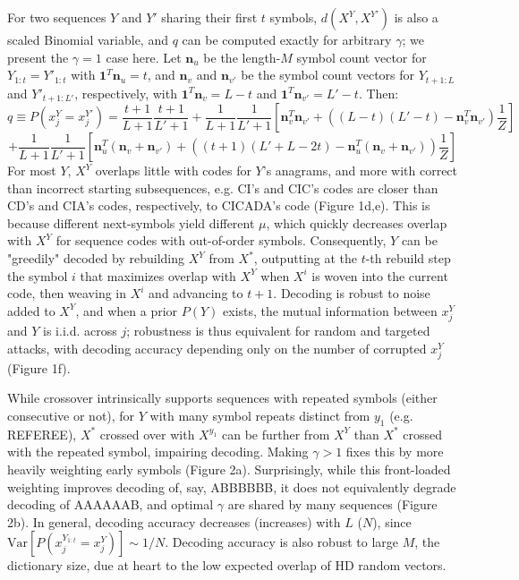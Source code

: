 \documentclass{article}
\begin{document}
For two sequences $Y$ and $Y'$ sharing their first $t$ symbols, $d(X^Y, X^{Y'})$ is also a scaled Binomial variable, and $q$ can be computed exactly for arbitrary $\gamma$; we present the $\gamma = 1$ case here. Let $\mathbf{n}_u$ be the length-$M$ symbol count vector for $Y_{1:t} = Y'_{1:t}$ with $\mathbf{1}^T\mathbf{n}_u = t$, and $\mathbf{n}_v$ and $\mathbf{n}_{v'}$ be the symbol count vectors for $Y_{t+1:L}$ and $Y'_{t+1:L'}$, respectively, with $\mathbf{1}^T\mathbf{n}_{v} = L - t$ and $\mathbf{1}^T\mathbf{n}_{v'} = L' - t$. Then:
$$q \equiv P(x_j^Y = x_j^{Y'}) = \frac{t+1}{L+1}\frac{t+1}{L'+1} + \frac{1}{L+1}\frac{1}{L'+1}\left[\mathbf{n}^T_v\mathbf{n}_{v'} + \left((L-t)(L'-t) - \mathbf{n}^T_v\mathbf{n}_{v'} \right)\frac{1}{Z}\right]$$
$$+\frac{1}{L+1}\frac{1}{L'+1}\left[
\mathbf{n}^T_{u}(\mathbf{n}_{v} + \mathbf{n}_{v'}) + \left((t+1)(L'+L-2t) - \mathbf{n}^T_{u}(\mathbf{n}_{v} + \mathbf{n}_{v'})
 \right)\frac{1}{Z}
\right]$$
For most $Y$, $X^Y$ overlaps little with codes for $Y$'s anagrams, and more with correct than incorrect starting subsequences, e.g. CI's and CIC's codes are closer than CD's and CIA's codes, respectively, to CICADA's code (Figure 1d,e). This is because different next-symbols yield different $\mu$, which quickly decreases overlap with $X^Y$ for sequence codes with out-of-order symbols. Consequently, $Y$ can be "greedily" decoded by rebuilding $X^Y$ from $X^*$, outputting at the $t$-th rebuild step the symbol $i$ that maximizes overlap with $X^Y$ when $X^i$ is woven into the current code, then weaving in $X^i$ and advancing to $t+1$. Decoding is robust to noise added to $X^Y$, and when a prior $P(Y)$ exists, the mutual information between $x_j^Y$ and $Y$ is i.i.d. across $j$; robustness is thus equivalent for random and targeted attacks, with decoding accuracy depending only on the number of corrupted $x_j^Y$ (Figure 1f).

While crossover intrinsically supports sequences with repeated symbols (either consecutive or not), for $Y$ with many symbol repeats distinct from $y_1$ (e.g. REFEREE), $X^*$ crossed over with $X^{y_1}$ can be further from $X^Y$ than $X^*$ crossed with the repeated symbol, impairing decoding. Making $\gamma > 1$ fixes this by more heavily weighting early symbols (Figure 2a). Surprisingly, while this front-loaded weighting improves decoding of, say, ABBBBBB, it does not equivalently degrade decoding of AAAAAAB, and optimal $\gamma$ are shared by many sequences (Figure 2b). In general, decoding accuracy decreases (increases) with $L$ ($N$), since $\textrm{Var}[P(x_j^{Y_{1:t}} = x_j^Y)] \sim 1/N$. Decoding accuracy is also robust to large $M$, the dictionary size, due at heart to the low expected overlap of HD random vectors.
\end{document}
